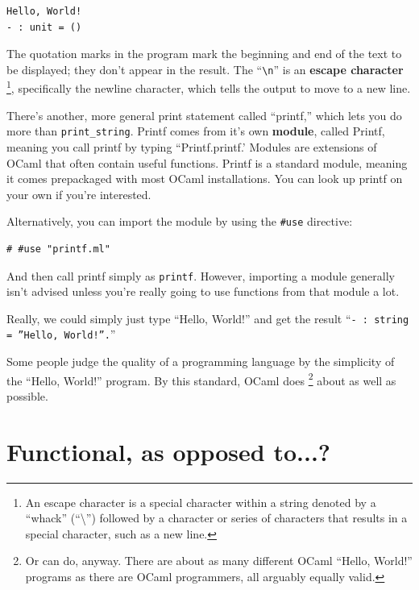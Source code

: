 \documentclass[10pt]{book}
\begin{document}
\beforeverb
\begin{verbatim}
Hello, World!
- : unit = ()
\end{verbatim}
\afterverb

The quotation marks in the program mark the beginning and end of the text to be displayed; they 
don't appear in the result. The ``\verb"\n"'' is an {\bf escape character} \footnote{An escape character 
is a special character within a string denoted by a ``whack'' (``\textbackslash'') followed by a character or 
series of characters that results in a special character, such as a new line.}, specifically the 
newline character, which tells the output to move to a new line.


There's another, more general print statement called ``printf,'' which lets you do more than {\tt print\verb"_"string}.
Printf comes from it's own {\bf module}, called Printf, meaning you call printf by typing ``Printf.printf.' 
Modules are extensions of OCaml that often contain useful functions. Printf is a standard module, meaning
it comes prepackaged with most OCaml installations. You can look up printf on your own if you're interested.

Alternatively, you can import the module by using the \verb"#use" directive:

\beforeverb
\begin{verbatim}
# #use "printf.ml"
\end{verbatim}
\afterverb
%
And then call printf simply as {\tt printf}. However, importing a module generally isn't advised  unless you're really going to use functions from that module a lot.


Really, we could simply just type ``Hello, World!'' and get the result ``{\tt - : string = ''Hello, World!''.}''

Some people judge the quality of a programming language by the simplicity of the ``Hello, World!'' program.  By this standard, OCaml does \footnote{Or can do, anyway. There are about as many different OCaml ``Hello, World!'' programs as there are OCaml programmers, all arguably equally valid.} about as well as possible.

\section{Functional, as opposed to...?}
\end{document}
